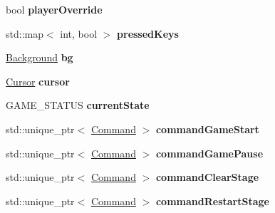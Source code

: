 \begin{DoxyCompactItemize}
\item 
\mbox{\label{classgame_1_1GameDialog_a62a4c0f4a728439f53886e362e3d15fe}} 
bool {\bfseries player\+Override}
\item 
\mbox{\label{classgame_1_1GameDialog_af0e8d1e789c9552cdc0f6a9f2dcd9e3c}} 
std\+::map$<$ int, bool $>$ {\bfseries pressed\+Keys}
\item 
\mbox{\label{classgame_1_1GameDialog_ac09d774d45ee879bfca90eac89da3c9a}} 
\hyperlink{classBackground}{Background} {\bfseries bg}
\item 
\mbox{\label{classgame_1_1GameDialog_a3dd11135d6ac99dfb335d0d025749b4b}} 
\hyperlink{classgame_1_1Cursor}{Cursor} {\bfseries cursor}
\item 
\mbox{\label{classgame_1_1GameDialog_a6d69c03e37c7ee1c7ad3daf0eed9d43a}} 
G\+A\+M\+E\+\_\+\+S\+T\+A\+T\+US {\bfseries current\+State}
\item 
\mbox{\label{classgame_1_1GameDialog_a26efb707880bdbf7b0b40a2b4de7a655}} 
std\+::unique\+\_\+ptr$<$ \hyperlink{classgame_1_1Command}{Command} $>$ {\bfseries command\+Game\+Start}
\item 
\mbox{\label{classgame_1_1GameDialog_a04258fc97d042e928b85bb4b24e784c4}} 
std\+::unique\+\_\+ptr$<$ \hyperlink{classgame_1_1Command}{Command} $>$ {\bfseries command\+Game\+Pause}
\item 
\mbox{\label{classgame_1_1GameDialog_aa196c8f6fbd53eed98995d67a2f7be2b}} 
std\+::unique\+\_\+ptr$<$ \hyperlink{classgame_1_1Command}{Command} $>$ {\bfseries command\+Clear\+Stage}
\item 
\mbox{\label{classgame_1_1GameDialog_a4212aff142abec8287e3a555e9f137b1}} 
std\+::unique\+\_\+ptr$<$ \hyperlink{classgame_1_1Command}{Command} $>$ {\bfseries command\+Restart\+Stage}
\item 
\mbox{\label{classgame_1_1GameDialog_a101ef135dbda9b8ca105ad3483eeaa93}} 

\end{DoxyCompactItemize}
